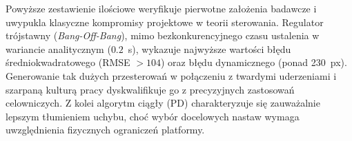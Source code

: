 \documentclass[a4paper,twoside,12pt]{book}
\begin{document}
\newpage
\begin{table}[H]
\centering
\caption{Zbiorcze zestawienie wskaźników jakości regulacji dla dystansu 80~cm.}
\label{tab:porownanie_wskaznikow}
\end{table}

Powyższe zestawienie ilościowe weryfikuje pierwotne założenia badawcze i uwypukla klasyczne kompromisy projektowe w teorii sterowania. Regulator trójstawny (\textit{Bang-Off-Bang}), mimo bezkonkurencyjnego czasu ustalenia w wariancie analitycznym ($0.2$~s), wykazuje najwyższe wartości błędu średniokwadratowego (RMSE $> 104$) oraz błędu dynamicznego (ponad 230~px). Generowanie tak dużych przesterowań w połączeniu z twardymi uderzeniami i szarpaną kulturą pracy dyskwalifikuje go z precyzyjnych zastosowań celowniczych. Z kolei algorytm ciągły (PD) charakteryzuje się zauważalnie lepszym tłumieniem uchybu, choć wybór docelowych nastaw wymaga uwzględnienia fizycznych ograniczeń platformy.
\end{document}
